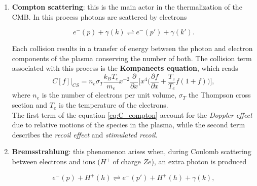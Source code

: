 \begin{enumerate}
    \item \textbf{Compton scattering}: this is the main actor in the thermalization of the CMB. In this process photons are scattered by electrons 
    \begin{multicols}{2}
        $$e^{-}(p)+\gamma(k)\rightleftharpoons e^{-}(p')+\gamma(k').$$\vspace{4cm}
        
    \end{multicols}
    Each collision results in a transfer of energy between the photon and electron components of the plasma conserving the number of both. The collision term associated with this process is the \textbf{Kompaneets equation}, which reads
    \begin{equation}
        C[f]\bigg|_{CS}=n_e\sigma_T\frac{k_BT_e}{m_e}x^{-2}\frac{\partial}{\partial x}\bigg[x^4\bigg(\frac{\partial f}{\partial x}+\frac{T_z}{T_e}f(1+f)\bigg)\bigg],\label{eq:C_compton}
    \end{equation}
    where $n_e$ is the number of electrons per unit volume, $\sigma_T$ the Thompson cross section and $T_e$ is the temperature of the electrons. \\
    The first term of the equation \eqref{eq:C_compton} account for the \emph{Doppler effect} due to relative motions of the species in the plasma, while the second term describes the \emph{recoil effect} and \emph{stimulated recoil}.
    \item \textbf{Bremsstrahlung}: this phenomenon arises when, during Coulomb scattering between electrons and ions ($H^+$ of charge $Ze$), an extra photon is produced
    \begin{multicols}{2}
        $$e^{-}(p)+H^+(h)\rightleftharpoons e^{-}(p')+H^+(h)+\gamma(k),$$\vspace{4cm}\\
\end{multicols}
\end{enumerate}
